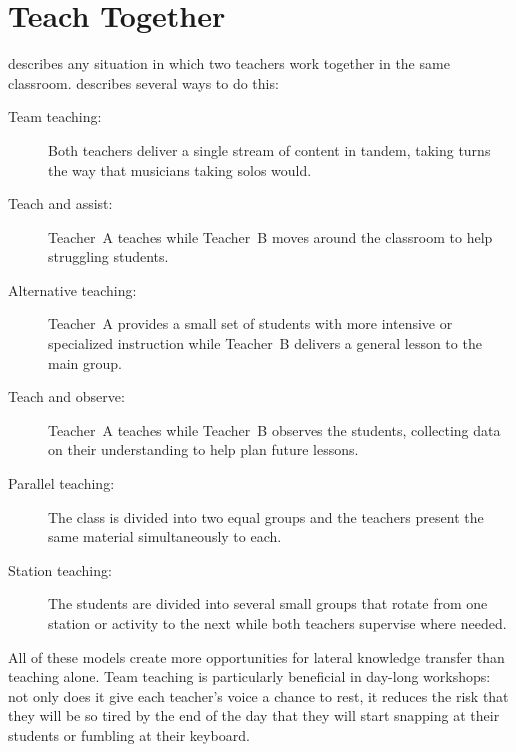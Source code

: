 \section{Teach Together}\label{s:classroom-together}

 describes any situation in which
two teachers work together in the same classroom.  \cite{Frie2016}
describes several ways to do this:

\begin{description}

  \item[Team teaching:] Both teachers deliver a single stream of
    content in tandem, taking turns the way that musicians taking
    solos would.

  \item[Teach and assist:] Teacher~A teaches while Teacher~B moves
    around the classroom to help struggling students.

  \item[Alternative teaching:] Teacher~A provides a small set of
    students with more intensive or specialized instruction while
    Teacher~B delivers a general lesson to the main group.

  \item[Teach and observe:] Teacher~A teaches while Teacher~B observes
    the students, collecting data on their understanding to help plan
    future lessons.

  \item[Parallel teaching:] The class is divided into two equal groups
    and the teachers present the same material simultaneously to each.

  \item[Station teaching:] The students are divided into several small
    groups that rotate from one station or activity to the next while
    both teachers supervise where needed.

\end{description}

All of these models create more opportunities for lateral knowledge
transfer than teaching alone.  Team teaching is particularly
beneficial in day-long workshops: not only does it give each teacher's
voice a chance to rest, it reduces the risk that they will be so tired
by the end of the day that they will start snapping at their students
or fumbling at their keyboard.


